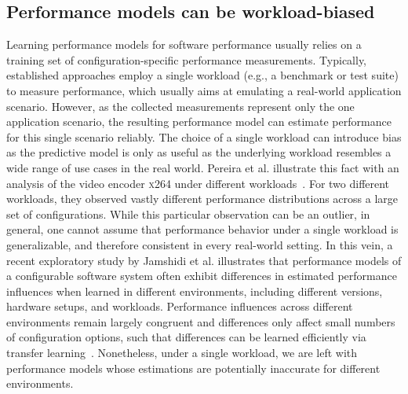 \subsection*{Performance models can be workload-biased}
Learning performance models for software performance usually relies on a training set of configuration-specific performance measurements. 
Typically, established approaches employ a single workload (e.g., a benchmark or test suite) to measure performance, which usually aims at emulating a real-world application scenario. 
However, as the collected measurements represent only the one application scenario, the resulting performance model can  estimate performance for this single scenario reliably. 
The choice of a single workload can introduce bias as the predictive model is only as useful as the underlying workload resembles a wide range of use cases in the real world. 
Pereira et al. illustrate this fact with an analysis of the video encoder \textsc{x264} under different workloads~\cite{alves_sampling_2020}. 
For two different workloads, they observed vastly different performance distributions across a large set of configurations.
While this particular observation can be an outlier, in general, one cannot assume that performance behavior under a single workload is generalizable, and therefore consistent in every real-world setting.
In this vein, a recent exploratory study by Jamshidi et al.\cite{jamishidi_transfer_2017} illustrates that performance models of a configurable software system often exhibit differences in estimated performance influences when learned in different environments, including different versions, hardware setups, and workloads.
Performance  influences across different environments remain largely congruent and differences only affect small numbers of configuration options, such that differences can be learned efficiently via transfer learning~\cite{jamshidi_transfer_gp_2017,jamshidi_learning_2018}. 
Nonetheless, under a single workload, we are left with performance models whose estimations are potentially inaccurate for different environments.

